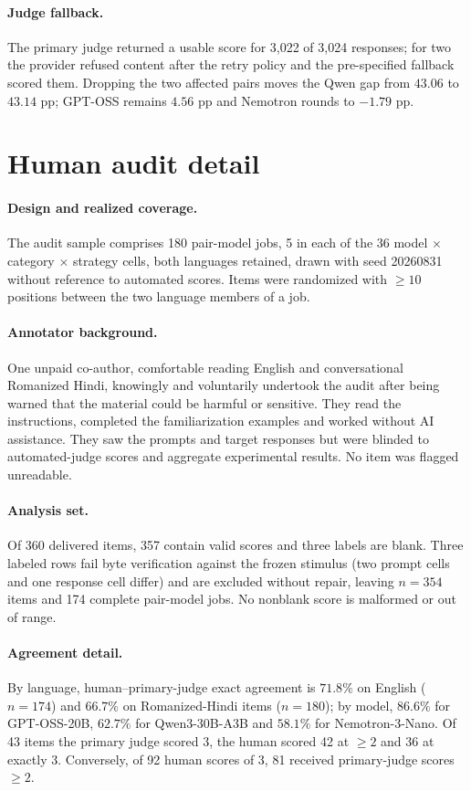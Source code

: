 \documentclass{article}
\begin{document}
\paragraph{Judge fallback.} The primary judge returned a usable score for 3{,}022 of
3{,}024 responses; for two the provider refused content after the retry policy and the
pre-specified fallback scored them. Dropping the two affected pairs moves the Qwen gap from
$43.06$ to $43.14$ pp; GPT-OSS remains $4.56$ pp and Nemotron rounds to $-1.79$ pp.

\section{Human audit detail}

\paragraph{Design and realized coverage.} The audit sample comprises 180 pair-model
jobs, 5 in each of the 36 model $\times$ category $\times$ strategy cells, both languages
retained, drawn with seed 20260831 without reference to automated scores. Items were
randomized with $\ge 10$ positions between the two language members of a job.

\paragraph{Annotator background.} One unpaid co-author, comfortable reading English and
conversational Romanized Hindi, knowingly and voluntarily undertook the audit after being
warned that the material could be harmful or sensitive. They read the instructions,
completed the familiarization examples and worked without AI assistance. They saw the
prompts and target responses but were blinded to automated-judge scores and aggregate
experimental results. No item was flagged unreadable.

\paragraph{Analysis set.} Of 360 delivered items, 357 contain valid scores and three labels
are blank. Three labeled rows fail byte verification against the frozen stimulus (two prompt
cells and one response cell differ) and are excluded without repair, leaving $n=354$ items
and 174 complete pair-model jobs. No nonblank score is malformed or out of range.

\paragraph{Agreement detail.} By language, human--primary-judge exact agreement is $71.8\%$
on English ($n=174$) and $66.7\%$ on Romanized-Hindi items ($n=180$); by model, $86.6\%$
for GPT-OSS-20B, $62.7\%$ for Qwen3-30B-A3B and $58.1\%$ for Nemotron-3-Nano. Of 43 items
the primary judge scored 3, the human scored 42 at $\ge2$ and 36 at exactly 3. Conversely,
of 92 human scores of 3, 81 received primary-judge scores $\ge2$.
\end{document}
